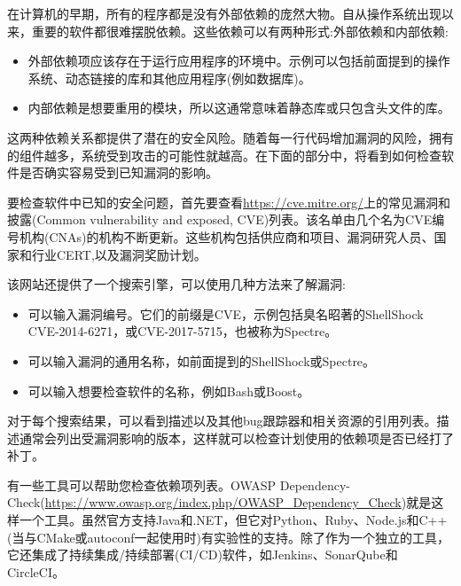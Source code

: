 
在计算机的早期，所有的程序都是没有外部依赖的庞然大物。自从操作系统出现以来，重要的软件都很难摆脱依赖。这些依赖可以有两种形式:外部依赖和内部依赖:

\begin{itemize}
\item 
外部依赖项应该存在于运行应用程序的环境中。示例可以包括前面提到的操作系统、动态链接的库和其他应用程序(例如数据库)。

\item 
内部依赖是想要重用的模块，所以这通常意味着静态库或只包含头文件的库。
\end{itemize}

这两种依赖关系都提供了潜在的安全风险。随着每一行代码增加漏洞的风险，拥有的组件越多，系统受到攻击的可能性就越高。在下面的部分中，将看到如何检查软件是否确实容易受到已知漏洞的影响。


要检查软件中已知的安全问题，首先要查看\url{https://cve.mitre.org/}上的常见漏洞和披露(Common vulnerability and exposed, CVE)列表。该名单由几个名为CVE编号机构(CNAs)的机构不断更新。这些机构包括供应商和项目、漏洞研究人员、国家和行业CERT,以及漏洞奖励计划。

该网站还提供了一个搜索引擎，可以使用几种方法来了解漏洞:

\begin{itemize}
\item 
可以输入漏洞编号。它们的前缀是CVE，示例包括臭名昭著的ShellShock CVE-2014-6271，或CVE-2017-5715，也被称为Spectre。

\item 
可以输入漏洞的通用名称，如前面提到的ShellShock或Spectre。

\item 
可以输入想要检查软件的名称，例如Bash或Boost。
\end{itemize}

对于每个搜索结果，可以看到描述以及其他bug跟踪器和相关资源的引用列表。描述通常会列出受漏洞影响的版本，这样就可以检查计划使用的依赖项是否已经打了补丁。


有一些工具可以帮助您检查依赖项列表。OWASP Dependency-Check(\url{https://www.owasp.org/index.php/OWASP\_Dependency\_Check})就是这样一个工具。虽然官方支持Java和.NET，但它对Python、Ruby、Node.js和C++(当与CMake或autoconf一起使用时)有实验性的支持。除了作为一个独立的工具，它还集成了持续集成/持续部署(CI/CD)软件，如Jenkins、SonarQube和CircleCI。

